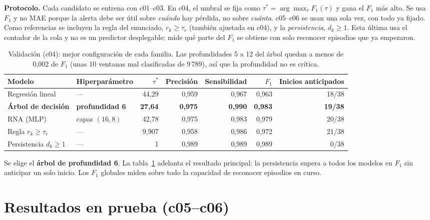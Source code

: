 \documentclass[11pt,a4paper]{article}
\begin{document}
\textbf{Protocolo.} Cada candidato se entrena con c01--c03. En c04, el umbral se fija como
$\tau^{*}=\arg\max_\tau F_1(\tau)$ y gana el $F_1$ más alto. Se usa $F_1$ y no MAE porque
la alerta debe ser útil sobre \emph{cuándo} hay pérdida, no sobre \emph{cuánta}. c05--c06
se usan una sola vez, con todo ya fijado. Como referencias se incluyen la regla del
enunciado, $r_k\ge\tau_r$ (también ajustada en c04), y la \emph{persistencia},
$d_k\ge1$. Esta última usa el contador de la cola y no es un predictor desplegable; mide
qué parte del $F_1$ se obtiene con solo reconocer episodios que ya empezaron.

\begin{table}[!htb]
\centering\small\setlength{\tabcolsep}{4.5pt}
\begin{tabular}{llrrrrr}
\toprule
Modelo & Hiperparámetro & $\tau^{*}$ & Precisión & Sensibilidad & $F_1$ & Inicios anticipados\\
\midrule
Regresión lineal & --- & 44,29 & 0,959 & 0,967 & 0,963 & 18/38\\
\textbf{Árbol de decisión} & \textbf{profundidad 6} & \textbf{27,64} & \textbf{0,975} & \textbf{0,990} & \textbf{0,983} & \textbf{19/38}\\
RNA (MLP) & capas $(16,8)$ & 42,78 & 0,975 & 0,983 & 0,979 & 20/38\\
\midrule
Regla $r_k\ge\tau_r$ & --- & 9,907 & 0,958 & 0,986 & 0,972 & 21/38\\
Persistencia $d_k\ge1$ & --- & 1 & 0,989 & 0,989 & 0,989 & 0/38\\
\bottomrule
\end{tabular}
\caption{Validación (c04): mejor configuración de cada familia. Las profundidades 5 a 12 del árbol quedan a menos de 0,002 de $F_1$ (unas 10 ventanas mal clasificadas de 9\,789), así que la profundidad no es crítica.}
\label{tab:validacion}
\end{table}

Se elige el \textbf{árbol de profundidad 6}. La tabla~\ref{tab:validacion} adelanta el
resultado principal: la persistencia supera a todos los modelos en $F_1$ sin anticipar un
solo inicio. Los $F_1$ globales miden sobre todo la capacidad de reconocer episodios en
curso.

\section{Resultados en prueba (c05--c06)}
\end{document}
